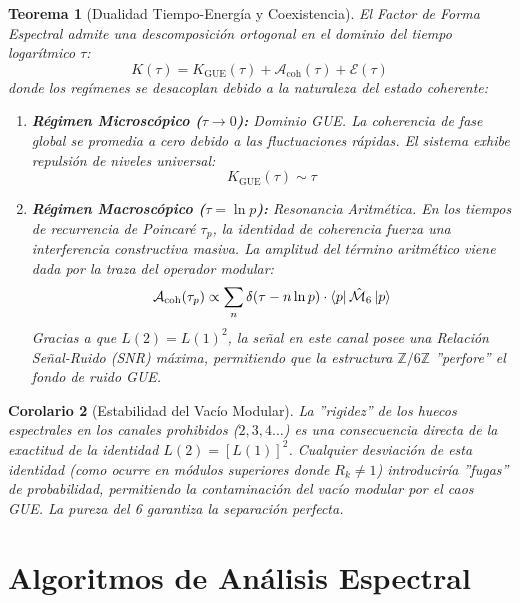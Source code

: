 \documentclass[12pt, a4paper]{article}
\theoremstyle{plain}
\newtheorem{teorema}{Teorema}[section]
\newtheorem{corolario}[teorema]{Corolario}
\theoremstyle{definition}
\newcommand{\Z}{\mathbb{Z}}
\begin{document}
\begin{teorema}[Dualidad Tiempo-Energía y Coexistencia]
El Factor de Forma Espectral admite una descomposición ortogonal en el dominio del tiempo logarítmico $\tau$:
\begin{equation}
    K(\tau) = K_{\text{GUE}}(\tau) + \mathcal{A}_{\text{coh}}(\tau) + \mathcal{E}(\tau)
\end{equation}
donde los regímenes se desacoplan debido a la naturaleza del estado coherente:

\begin{enumerate}
    \item \textbf{Régimen Microscópico ($\tau \to 0$):} Dominio GUE.
    La coherencia de fase global se promedia a cero debido a las fluctuaciones rápidas. El sistema exhibe repulsión de niveles universal:
    \[ K_{\text{GUE}}(\tau) \sim \tau \]
    
    \item \textbf{Régimen Macroscópico ($\tau = \ln p$):} Resonancia Aritmética.
    En los tiempos de recurrencia de Poincaré $\tau_p$, la identidad de coherencia fuerza una interferencia constructiva masiva. La amplitud del término aritmético viene dada por la traza del operador modular:
    \begin{equation}
        \mathcal{A}_{\text{coh}}(\tau_p) \propto \sum_{n} \delta(\tau - n\ln p) \cdot \bra{p}\hat{\mathcal{M}}_6\ket{p}
    \end{equation}
    Gracias a que $L(2) = L(1)^2$, la señal en este canal posee una Relación Señal-Ruido (SNR) máxima, permitiendo que la estructura $\Z/6\Z$ ''perfore'' el fondo de ruido GUE.
\end{enumerate}
\end{teorema}

\begin{corolario}[Estabilidad del Vacío Modular]
La ''rigidez'' de los huecos espectrales en los canales prohibidos ($2,3,4 \dots$) es una consecuencia directa de la exactitud de la identidad $L(2)=[L(1)]^2$. Cualquier desviación de esta identidad (como ocurre en módulos superiores donde $R_k \neq 1$) introduciría ''fugas'' de probabilidad, permitiendo la contaminación del vacío modular por el caos GUE. La pureza del 6 garantiza la separación perfecta.
\end{corolario}

\section{Algoritmos de Análisis Espectral}
\end{document}

